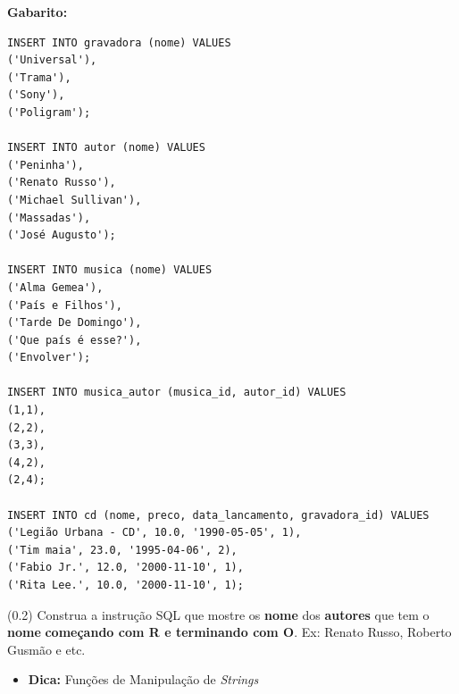 \documentclass[12pt]{exam}
\begin{document}
\begin{questions}
\textbf{Gabarito:}
\begin{verbatim}
INSERT INTO gravadora (nome) VALUES 
('Universal'),
('Trama'),
('Sony'),
('Poligram');

INSERT INTO autor (nome) VALUES 
('Peninha'),
('Renato Russo'),
('Michael Sullivan'),
('Massadas'),
('José Augusto');

INSERT INTO musica (nome) VALUES 
('Alma Gemea'),
('País e Filhos'),
('Tarde De Domingo'),
('Que país é esse?'),
('Envolver');

INSERT INTO musica_autor (musica_id, autor_id) VALUES 
(1,1),
(2,2),
(3,3),
(4,2),
(2,4);

INSERT INTO cd (nome, preco, data_lancamento, gravadora_id) VALUES 
('Legião Urbana - CD', 10.0, '1990-05-05', 1),
('Tim maia', 23.0, '1995-04-06', 2),
('Fabio Jr.', 12.0, '2000-11-10', 1),
('Rita Lee.', 10.0, '2000-11-10', 1);
\end{verbatim}







\question (0.2)  Construa a instrução SQL que mostre os \textbf{nome} dos \textbf{autores} que tem o \textbf{nome} \textbf{começando com R e terminando com O}. Ex: Renato Russo, Roberto Gusmão e etc.

\begin{itemize}
    \item \textbf{Dica:} Funções de Manipulação de \textit{Strings}
\end{itemize}


\end{questions}
\end{document}
